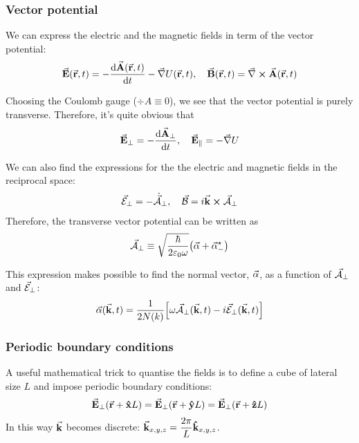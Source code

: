 \subsubsection*{Vector potential}
We can express the electric and the magnetic fields in term of the vector potential:
\begin{align}
	\va{E}(\va{r},t) = - \dv{\va{A}(\va{r},t)}{t} - \grad{U}(\va{r},t) \qc \va{B}(\va{r},t) = \curl{A}(\va{r},t)
\end{align}

Choosing the Coulomb gauge ($\div{A} \equiv 0$), we see that the vector potential is purely transverse. Therefore, it's quite obvious that
\begin{align*}
	\trn{\va{E}} = - \dv{\trn{\va{A}}}{t} \qc \lng{\va{E}} = - \grad{U}
\end{align*}

We can also find the expressions for the the electric and magnetic fields in the reciprocal space:
\begin{align*}
	\trn{\vare{E}} = - \trn{\dot{\vare{A}}} \qc \vare{B} = i \va{k} \cross \trn{\vare{A}}
\end{align*}
Therefore, the transverse vector potential can be written as
\begin{align}
	{\va{\mathcal{A}}}_{\perp} \equiv \sqrt{\frac{\hbar}{2 \varepsilon_{0} \omega}} \qty(\va{\alpha} + \va{\alpha}_{-}^{\star}{})
\end{align}

This expression makes possible to find the normal vector, $\va{\alpha}$, as a function of ${\va{\mathcal{A}}}_{\perp}$ and ${\va{\mathcal{E}}}_{\perp}$:
\begin{align}
	\va{\alpha}(\va{k},t) = \frac{1}{2 N(k)} \qty[\omega {\va{\mathcal{A}}}_{\perp}(\va{k},t) - i {\va{\mathcal{E}}}_{\perp}(\va{k},t)]
\end{align}

\subsubsection*{Periodic boundary conditions}
A useful mathematical trick to quantise the fields is to define a cube of lateral size $L$ and impose periodic boundary conditions:
\begin{align*}
	{\va{E}}_{\perp}(\va{r} + \vu{x} L) = {\va{E}}_{\perp}(\va{r} + \vu{y} L) = {\va{E}}_{\perp}(\va{r} + \vu{z} L)
\end{align*}
In this way $\va{k}$ becomes discrete: $\va{k}_{x,y,z} = \dfrac{2\pi}{L} \vu{k}_{x,y,z}$.

